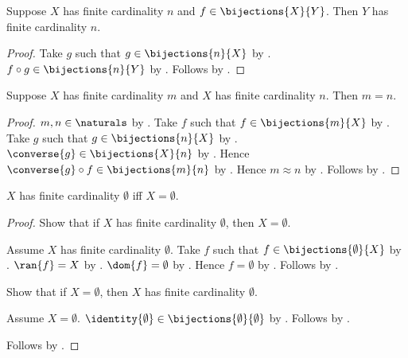 \begin{proposition}\label{finite_cardinality_bijection}
    Suppose $X$ has finite cardinality $n$ and
        $f\in\bijections{X}{Y}$.
    Then $Y$ has finite cardinality $n$.
\end{proposition}
\begin{proof}
    Take $g$ such that $g\in\bijections{n}{X}$ by
        .
    $f\circ g\in\bijections{n}{Y}$ by .
    Follows by .
\end{proof}

\begin{theorem}\label{finite_cardinality_unique}
    Suppose $X$ has finite cardinality $m$ and
        $X$ has finite cardinality $n$.
    Then $m=n$.
\end{theorem}
\begin{proof}
    $m,n\in\naturals$ by .
    Take $f$ such that $f\in\bijections{m}{X}$ by
        .
    Take $g$ such that $g\in\bijections{n}{X}$ by
        .
    $\converse{g}\in\bijections{X}{n}$ by
        .
    Hence $\converse{g}\circ f\in\bijections{m}{n}$ by
        .
    Hence $m\approx n$ by .
    Follows by .
\end{proof}

\begin{proposition}\label{finite_cardinality_zero_iff_emptyset}
    $X$ has finite cardinality $\emptyset$ iff $X=\emptyset$.
\end{proposition}
\begin{proof}
    Show that if $X$ has finite cardinality $\emptyset$, then
        $X=\emptyset$.
    \begin{subproof}
        Assume $X$ has finite cardinality $\emptyset$.
        Take $f$ such that $f\in\bijections{\emptyset}{X}$ by
            .
        $\ran{f}=X$ by .
        $\dom{f}=\emptyset$ by .
        Hence $f=\emptyset$ by
            .
        Follows by .
    \end{subproof}
    Show that if $X=\emptyset$, then
        $X$ has finite cardinality $\emptyset$.
    \begin{subproof}
        Assume $X=\emptyset$.
        $\identity{\emptyset}\in
            \bijections{\emptyset}{\emptyset}$ by
            .
        Follows by .
    \end{subproof}
    Follows by \auto.
\end{proof}

